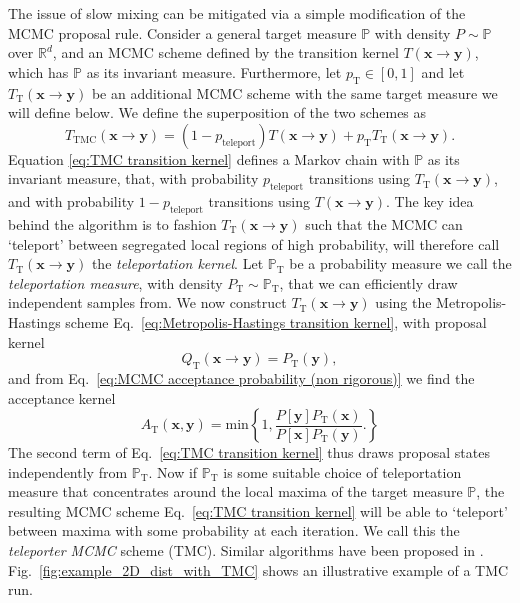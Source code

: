 The issue of slow mixing can be mitigated via a simple modification of the MCMC proposal rule. Consider a general target measure $\mathbb{P}$ with density $P \sim \mathbb{P}$ over $\mathbb{R}^d$, and an MCMC scheme defined by the transition kernel $T(\mathbf{x} \to \mathbf{y})$, which has $\mathbb{P}$ as its invariant measure. Furthermore, let $p_\text{T} \in [0,1]$ and let $T_\text{T}(\mathbf{x} \to \mathbf{y})$ be an additional MCMC scheme with the same target measure we will define below. We define the superposition of the two schemes as
\begin{equation} \label{eq:TMC transition kernel}
	T_\text{TMC} (\mathbf{x} \to \mathbf{y}) = (1 - p_\text{teleport}) T(\mathbf{x} \to \mathbf{y}) + p_\text{T} T_\text{T}(\mathbf{x} \to \mathbf{y}).
\end{equation}
Equation \ref{eq:TMC transition kernel} defines a Markov chain with $\mathbb{P}$ as its invariant measure, that, with probability $p_\text{teleport}$ transitions using $T_\text{T}(\mathbf{x} \to \mathbf{y})$, and with probability $1-p_\text{teleport}$ transitions using $T(\mathbf{x} \to \mathbf{y})$. The key idea behind the algorithm is to fashion $T_\text{T}(\mathbf{x} \to \mathbf{y})$ such that the MCMC can `teleport' between segregated local regions of high probability, will therefore call $T_\text{T}(\mathbf{x} \to \mathbf{y})$ the \textit{teleportation kernel}. Let $\mathbb{P}_\text{T}$ be a probability measure we call the \textit{teleportation measure}, with density $P_\text{T} \sim \mathbb{P}_\text{T}$, that we can efficiently draw independent samples from. We now construct $T_\text{T}(\mathbf{x} \to \mathbf{y})$ using the Metropolis-Hastings scheme Eq.~\ref{eq:Metropolis-Hastings transition kernel}, with proposal kernel
\begin{equation} \label{eq:teleportation proposal}
	Q_\text{T}(\mathbf{x} \to \mathbf{y}) = P_\text{T}(\mathbf{y}),
\end{equation}
and from Eq.~\ref{eq:MCMC acceptance probability (non rigorous)} we find the acceptance kernel
\begin{equation} \label{eq:teleportation acceptance}
	A_\text{T}(\mathbf{x}, \mathbf{y}) = \text{min} \left\{
		1, \frac{P[\mathbf{y}] P_\text{T}(\mathbf{x}) }{P[\mathbf{x}] P_\text{T}(\mathbf{y}) }.
	\right\}
\end{equation}
The second term of Eq.~\ref{eq:TMC transition kernel} thus draws proposal states independently from $\mathbb{P}_\text{T}$. Now if $\mathbb{P}_\text{T}$ is some suitable choice of teleportation measure that concentrates around the local maxima of the target measure $\mathbb{P}$, the resulting MCMC scheme Eq.~\ref{eq:TMC transition kernel} will be able to `teleport' between maxima with some probability at each iteration. We call this the \textit{teleporter MCMC} scheme (TMC). Similar algorithms have been proposed in \citep{sminchisescuModeHoppingMCMCSamplera, lindseyEnsembleMarkovChain2021}. Fig.~\ref{fig:example_2D_dist_with_TMC} shows an illustrative example of a TMC run.

